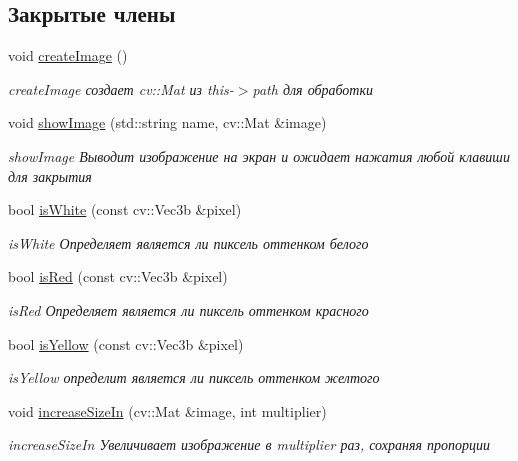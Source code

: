 \subsection*{Закрытые члены}
\begin{DoxyCompactItemize}
\item 
void \hyperlink{class_correction_addd8e0c7fbc69b9ba791d80659539731}{create\+Image} ()
\begin{DoxyCompactList}\small\item\em create\+Image создает cv\+::\+Mat из this-\/$>$path для обработки \end{DoxyCompactList}\item 
void \hyperlink{class_correction_a9ed7e4258c66b154f585f71815fd477b}{show\+Image} (std\+::string name, cv\+::\+Mat \&image)
\begin{DoxyCompactList}\small\item\em show\+Image Выводит изображение на экран и ожидает нажатия любой клавиши для закрытия \end{DoxyCompactList}\item 
bool \hyperlink{class_correction_a8f6f95589a0bb8df6815832155947390}{is\+White} (const cv\+::\+Vec3b \&pixel)
\begin{DoxyCompactList}\small\item\em is\+White Определяет является ли пиксель оттенком белого \end{DoxyCompactList}\item 
bool \hyperlink{class_correction_a1d3860fc36bdf0cb385de6061f87a6b8}{is\+Red} (const cv\+::\+Vec3b \&pixel)
\begin{DoxyCompactList}\small\item\em is\+Red Определяет является ли пиксель оттенком красного \end{DoxyCompactList}\item 
bool \hyperlink{class_correction_ac0ebbb080cf4ec47f02f3ac8d61f67df}{is\+Yellow} (const cv\+::\+Vec3b \&pixel)
\begin{DoxyCompactList}\small\item\em is\+Yellow определит является ли пиксель оттенком желтого \end{DoxyCompactList}\item 
void \hyperlink{class_correction_a5e8896ab6365772cbeb7f844edd3402d}{increase\+Size\+In} (cv\+::\+Mat \&image, int multiplier)
\begin{DoxyCompactList}\small\item\em increase\+Size\+In Увеличивает изображение в multiplier раз, сохраняя пропорции \end{DoxyCompactList}\item 

\end{DoxyCompactItemize}
